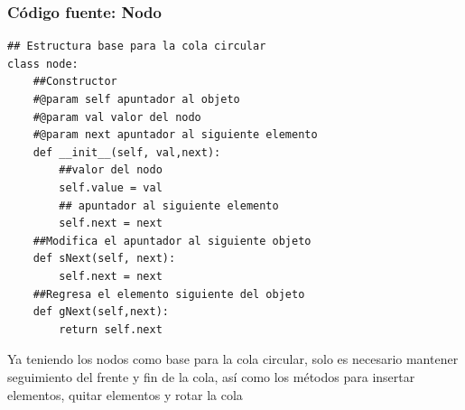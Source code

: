 \documentclass[12pt]{article}
\begin{document}
\subsubsection{Código fuente: Nodo}
\begin{verbatim}
## Estructura base para la cola circular
class node:
    ##Constructor
    #@param self apuntador al objeto
    #@param val valor del nodo
    #@param next apuntador al siguiente elemento
    def __init__(self, val,next):
        ##valor del nodo
        self.value = val
        ## apuntador al siguiente elemento
        self.next = next
    ##Modifica el apuntador al siguiente objeto
    def sNext(self, next):
        self.next = next
    ##Regresa el elemento siguiente del objeto
    def gNext(self,next):
        return self.next

\end{verbatim}
Ya teniendo los nodos como base para la cola circular, solo es necesario mantener seguimiento del frente y fin de la cola, así como los métodos para insertar elementos, quitar elementos  y rotar la cola
\end{document}
